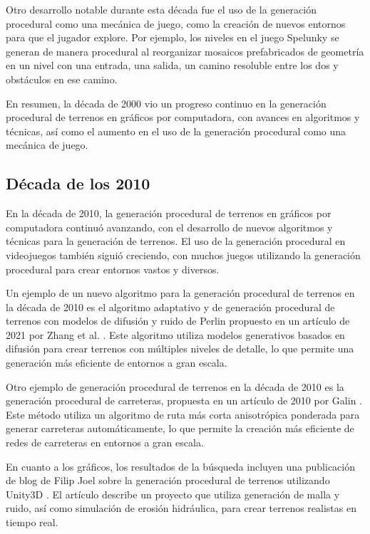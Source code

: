 Otro desarrollo notable durante esta década fue el uso de la generación procedural como una mecánica de juego, como la creación de nuevos entornos para que el jugador explore. Por ejemplo, los niveles en el juego Spelunky se generan de manera procedural al reorganizar mosaicos prefabricados de geometría en un nivel con una entrada, una salida, un camino resoluble entre los dos y obstáculos en ese camino.

En resumen, la década de 2000 vio un progreso continuo en la generación procedural de terrenos en gráficos por computadora, con avances en algoritmos y técnicas, así como el aumento en el uso de la generación procedural como una mecánica de juego.

\subsection{Década de los 2010}
En la década de 2010, la generación procedural de terrenos en gráficos por computadora continuó avanzando, con el desarrollo de nuevos algoritmos y técnicas para la generación de terrenos. El uso de la generación procedural en videojuegos también siguió creciendo, con muchos juegos utilizando la generación procedural para crear entornos vastos y diversos.

Un ejemplo de un nuevo algoritmo para la generación procedural de terrenos en la década de 2010 es el algoritmo adaptativo y de generación procedural de terrenos con modelos de difusión y ruido de Perlin propuesto en un artículo de 2021 por Zhang et al.
\cite{AdaptiveandMulti-resolutionProcedurtalInfiniteTerrain}. Este algoritmo utiliza modelos generativos basados en difusión para crear terrenos con múltiples niveles de detalle, lo que permite una generación más eficiente de entornos a gran escala.

Otro ejemplo de generación procedural de terrenos en la década de 2010 es la generación procedural de carreteras, propuesta en un artículo de 2010 por Galin \cite{ProceduralGenerationRoads}
. Este método utiliza un algoritmo de ruta más corta anisotrópica ponderada para generar carreteras automáticamente, lo que permite la creación más eficiente de redes de carreteras en entornos a gran escala.

En cuanto a los gráficos, los resultados de la búsqueda incluyen una publicación de blog de Filip Joel sobre la generación procedural de terrenos utilizando Unity3D \cite{ProceduralTerrainGeneration}. El artículo describe un proyecto que utiliza generación de malla y ruido, así como simulación de erosión hidráulica, para crear terrenos realistas en tiempo real.

